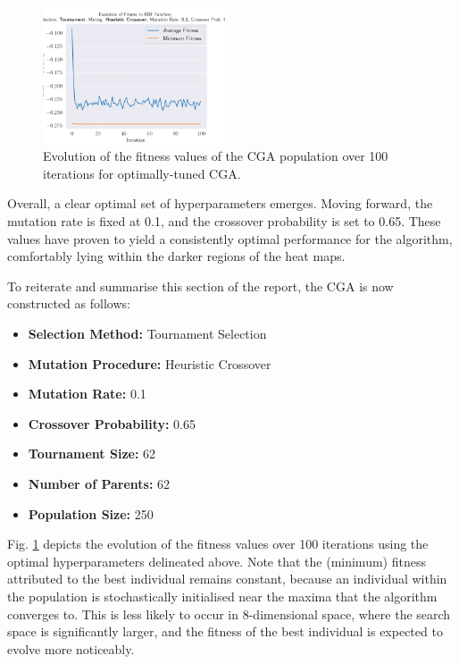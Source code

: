 \documentclass[10pt]{article}
\begin{document}
\begin{multicols}{2}
\begin{figure}[H]
    \centering
    \includegraphics[width=0.48\textwidth]{../figures/Permanent Images/0.1_0.65_Fitness.png}
    \captionsetup{justification=centering}
    \caption{Evolution of the fitness values of the CGA population over 100 iterations for optimally-tuned CGA.}
    \label{fig:CGA_fitness_evo_OPT}
\end{figure}

Overall, a clear optimal set of hyperparameters emerges. Moving forward, the mutation rate is fixed at 0.1, and the crossover probability is set to 0.65. These values have proven to yield a consistently optimal performance for the algorithm, comfortably lying within the darker regions of the heat maps.

To reiterate and summarise this section of the report, the CGA is now constructed as follows:
\begin{itemize}
    \item \textbf{Selection Method:} Tournament Selection
    \item \textbf{Mutation Procedure:} Heuristic Crossover
    \item \textbf{Mutation Rate:} 0.1
    \item \textbf{Crossover Probability:} 0.65
    \item \textbf{Tournament Size:} 62
    \item \textbf{Number of Parents:} 62
    \item \textbf{Population Size:} 250
\end{itemize}

Fig. \ref{fig:CGA_fitness_evo_OPT} depicts the evolution of the fitness values over 100 iterations using the optimal hyperparameters delineated above. Note that the (minimum) fitness attributed to the best individual remains constant, because an individual within the population is stochastically initialised near the maxima that the algorithm converges to. This is less likely to occur in 8-dimensional space, where the search space is significantly larger, and the fitness of the best individual is expected to evolve more noticeably.


\end{multicols}
\end{document}
